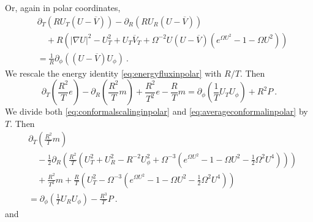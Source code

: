 \documentclass[a4paper]{amsart}
\providecommand{\abs}[1]{\lvert #1 \rvert}
\begin{document}
Or, again in polar coordinates,
\begin{equation}
  \begin{split}
    &\partial_T
    (R U_T (U - \overline{V}))
    -
    \partial_R
    (R U_R (U - \overline{V})) \\
    &\quad+
    R
    \left(
    \abs{\nabla U}^2
    -
    U_T^2
    +
    U_T \overline{V}_T 
    +
    \Omega^{-2} U (U - \overline{V})
    (e^{\Omega U^2} - 1 - \Omega U^2)
    \right) \\
    &=
    \frac{1}{R} \partial_\phi((U - \overline{V}) U_\phi) \ .
  \end{split}
  \label{eq:averageconformalinpolar}
\end{equation}
We rescale the energy identity \eqref{eq:energyfluxinpolar} with $R /
T$. Then
\begin{equation}
  \partial_T
  (\frac{R^2}{T} e)
  -
  \partial_R
  (\frac{R^2}{T} m)
  +
  \frac{R^2}{T^2} e
  -
  \frac{R}{T} m
  =
  \partial_\phi
  (\frac{1}{T} U_T U_\phi)
  +
  R^2 P \ .
  \label{eq:energyscaledinpolar}
\end{equation}
We divide both \eqref{eq:conformalscalinginpolar} and
\eqref{eq:averageconformalinpolar} by $T$. Then
\begin{equation}
  \begin{split}
    &\partial_T (\frac{R^2}{T} m) \\
    &\quad-
    \frac{1}{2}
    \partial_R
    \left(
    \frac{R^2}{T}
    (
    U_T^2 + U_R^2 - R^{-2} U_\phi^2
    +
    \Omega^{-3}
    (e^{\Omega U^2} - 1 - \Omega U^2 - \frac{1}{2} \Omega^2 U^4)
    )
    \right) \\
    &\quad+
    \frac{R^2}{T^2} m
    +
    \frac{R}{T}
    \left(
    U_T^2
    - 
    \Omega^{-3}
    (e^{\Omega U^2} - 1 - \Omega U^2 - \frac{1}{2} \Omega^2 U^4)
    \right) \\
    &=
    \partial_\phi (\frac{1}{T} U_R U_\phi)
    -
    \frac{R^3}{T} P \ .
  \end{split}
  \label{eq:scalingscaledinpolar}
\end{equation}
and
\end{document}
